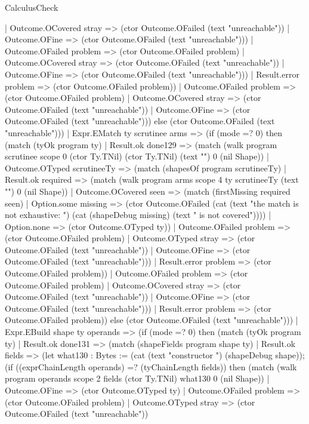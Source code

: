 \begin{lexlean}{CalculusCheck}
\begin{semanticmodule}
{            | Outcome.OCovered stray => (ctor Outcome.OFailed (text "unreachable"))
            | Outcome.OFine => (ctor Outcome.OFailed (text "unreachable")))
          | Outcome.OFailed problem => (ctor Outcome.OFailed problem)
          | Outcome.OCovered stray => (ctor Outcome.OFailed (text "unreachable"))
          | Outcome.OFine => (ctor Outcome.OFailed (text "unreachable")))
        | Result.error problem => (ctor Outcome.OFailed problem))
      | Outcome.OFailed problem => (ctor Outcome.OFailed problem)
      | Outcome.OCovered stray => (ctor Outcome.OFailed (text "unreachable"))
      | Outcome.OFine => (ctor Outcome.OFailed (text "unreachable"))) else (ctor Outcome.OFailed (text "unreachable")))
    | Expr.EMatch ty scrutinee arms => (if (mode =? 0) then (match (tyOk program ty)
      | Result.ok done129 => (match (walk program scrutinee scope 0 (ctor Ty.TNil) (ctor Ty.TNil) (text "") 0 (nil Shape))
        | Outcome.OTyped scrutineeTy => (match (shapesOf program scrutineeTy)
          | Result.ok required => (match (walk program arms scope 4 ty scrutineeTy (text "") 0 (nil Shape))
            | Outcome.OCovered seen => (match (firstMissing required seen)
              | Option.some missing => (ctor Outcome.OFailed (cat (text "the match is not exhaustive: ") (cat (shapeDebug missing) (text " is not covered"))))
              | Option.none => (ctor Outcome.OTyped ty))
            | Outcome.OFailed problem => (ctor Outcome.OFailed problem)
            | Outcome.OTyped stray => (ctor Outcome.OFailed (text "unreachable"))
            | Outcome.OFine => (ctor Outcome.OFailed (text "unreachable")))
          | Result.error problem => (ctor Outcome.OFailed problem))
        | Outcome.OFailed problem => (ctor Outcome.OFailed problem)
        | Outcome.OCovered stray => (ctor Outcome.OFailed (text "unreachable"))
        | Outcome.OFine => (ctor Outcome.OFailed (text "unreachable")))
      | Result.error problem => (ctor Outcome.OFailed problem)) else (ctor Outcome.OFailed (text "unreachable")))
    | Expr.EBuild shape ty operands => (if (mode =? 0) then (match (tyOk program ty)
      | Result.ok done131 => (match (shapeFields program shape ty)
        | Result.ok fields => (let what130 : Bytes := (cat (text "constructor ") (shapeDebug shape)); (if ((exprChainLength operands) =? (tyChainLength fields)) then (match (walk program operands scope 2 fields (ctor Ty.TNil) what130 0 (nil Shape))
          | Outcome.OFine => (ctor Outcome.OTyped ty)
          | Outcome.OFailed problem => (ctor Outcome.OFailed problem)
          | Outcome.OTyped stray => (ctor Outcome.OFailed (text "unreachable"))
}
\end{semanticmodule}
\end{lexlean}
